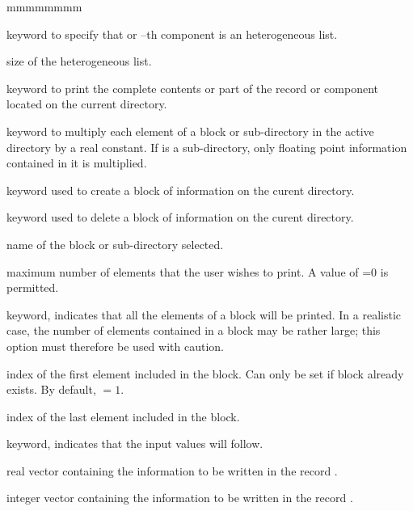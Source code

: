 \begin{ListeDeDescription}{mmmmmmmm}
\item[\moc{LIST}] keyword to specify that  or --th component is an heterogeneous list.

\item[\dusa{nsize}] size of the heterogeneous list.

\item[\moc{IMPR}] keyword to print the complete contents or part of the record
 or component  located on the current directory.

\item[\moc{MULT}] keyword to multiply each element of a block or sub-directory
in the active directory by a real constant. If  is a
sub-directory, only floating point information contained in it is multiplied.

\item[\moc{CREA}] keyword used to create a block of information on the
curent directory.

\item[\moc{DEL}] keyword used to delete a block of information on the
curent directory.

\item[\dusa{BLOCK}] name of the block or sub-directory selected.

\item[\dusa{ileni}] maximum number of elements that the user wishes to print.
A value of =0 is permitted.

\item[\moc{*}] keyword, indicates that all the elements of a block will be
printed. In a realistic case, the number of elements contained in a block may be
rather large; this option must therefore be used with caution.

\item[\dusa{ilenc1}] index of the first element included in the block. Can only be set if block
 already exists. By default,  $=1$.

\item[\dusa{ilenc2}] index of the last element included in the block.

\item[\moc{=}] keyword, indicates that the input values will follow.

\item[\dusa{valc}] real vector containing the information to be written in
the record .

\item[\dusa{ivalc}] integer vector containing the information to be written in
the record .


\end{ListeDeDescription}
